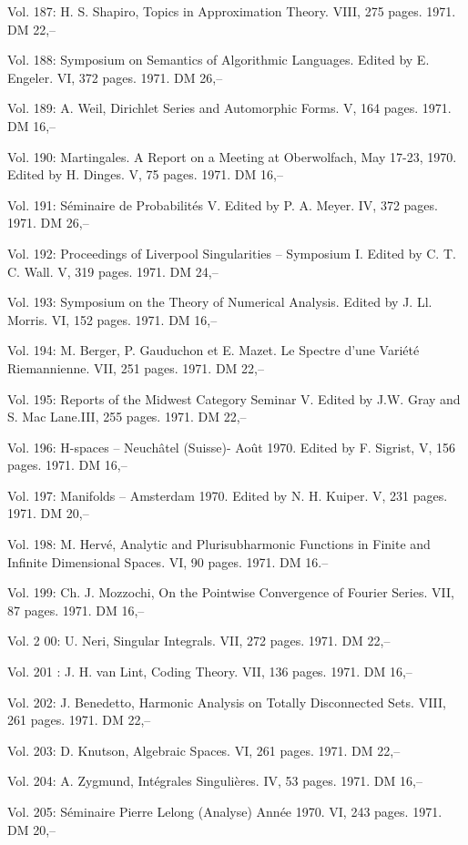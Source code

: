 Vol. 187: H. S. Shapiro, Topics in Approximation Theory. VIII, 275 pages. 1971. DM 22,--

Vol. 188: Symposium on Semantics of Algorithmic Languages. Edited by E. Engeler. VI, 372 pages. 1971. DM 26,--

Vol. 189: A. Weil, Dirichlet Series and Automorphic Forms. V, 164 pages. 1971. DM 16,--

Vol. 190: Martingales. A Report on a Meeting at Oberwolfach, May 17-23, 1970. Edited by H. Dinges. V, 75 pages. 1971. DM 16,--

Vol. 191: Séminaire de Probabilités V. Edited by P. A. Meyer. IV, 372 pages. 1971. DM 26,--

Vol. 192: Proceedings of Liverpool Singularities -- Symposium I. Edited by C. T. C. Wall. V, 319 pages. 1971. DM 24,--

Vol. 193: Symposium on the Theory of Numerical Analysis. Edited by J. Ll. Morris. VI, 152 pages. 1971. DM 16,--

Vol. 194: M. Berger, P. Gauduchon et E. Mazet. Le Spectre d'une Variété Riemannienne. VII, 251 pages. 1971. DM 22,--

Vol. 195: Reports of the Midwest Category Seminar V. Edited by J.W. Gray and S. Mac Lane.III, 255 pages. 1971. DM 22,--

Vol. 196: H-spaces -- Neuchâtel (Suisse)- Août 1970. Edited by F. Sigrist, V, 156 pages. 1971. DM 16,--

Vol. 197: Manifolds -- Amsterdam 1970. Edited by N. H. Kuiper. V, 231 pages. 1971. DM 20,--

Vol. 198: M. Hervé, Analytic and Plurisubharmonic Functions in Finite and Infinite Dimensional Spaces. VI, 90 pages. 1971. DM 16.--

Vol. 199: Ch. J. Mozzochi, On the Pointwise Convergence of Fourier Series. VII, 87 pages. 1971. DM 16,--

Vol. 2 00: U. Neri, Singular Integrals. VII, 272 pages. 1971. DM 22,--

Vol. 201 : J. H. van Lint, Coding Theory. VII, 136 pages. 1971. DM 16,--

Vol. 202: J. Benedetto, Harmonic Analysis on Totally Disconnected Sets. VIII, 261 pages. 1971. DM 22,--

Vol. 203: D. Knutson, Algebraic Spaces. VI, 261 pages. 1971. DM 22,--

Vol. 204: A. Zygmund, Intégrales Singulières. IV, 53 pages. 1971. DM 16,--

Vol. 205: Séminaire Pierre Lelong (Analyse) Année 1970. VI, 243 pages. 1971. DM 20,--


